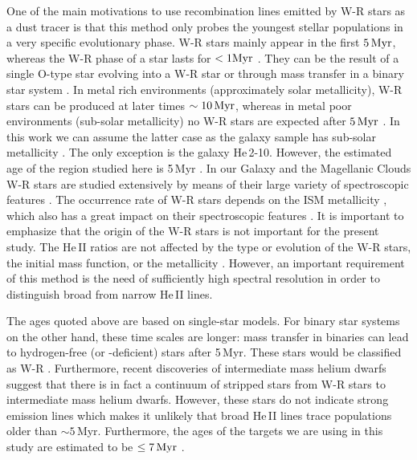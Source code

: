 \documentclass[]{aastex63}
\begin{document}
One of the main motivations to use recombination lines emitted by W-R stars as a dust tracer is that this method only probes the youngest stellar populations in a very specific evolutionary phase.
W-R stars mainly appear in the first ${\rm 5\,Myr}$, whereas the W-R phase of a star lasts for $< 1 {\rm Myr}$ \citep{meynet_stellar_2005}.
They can be the result of a single O-type star evolving into a W-R star \citep{meynet_massive_2017} or through mass transfer in a binary star system \citep{eldridge_binary_2017}. 
In metal rich environments (approximately solar metallicity), W-R stars can be produced at later times $\sim {\rm 10\,Myr}$, whereas in metal poor environments (sub-solar metallicity) no W-R stars are expected after ${\rm 5\,Myr}$ \citep[see Figure\,14 in ][]{leitherer_effects_2014}. In this work we can assume the latter case as the galaxy sample has sub-solar metallicity \citep[see Table\,1 in][]{chandar_ngc_2004}. The only exception is the galaxy He\,2-10. However, the estimated age of the region studied here is 5\,Myr \citep[see Table\,2 in][]{chandar_ngc_2004}.
In our Galaxy and the Magellanic Clouds W-R stars are studied extensively by means of their large variety of spectroscopic features \citep{crowther_physical_2007}. 
The occurrence rate of W-R stars depends on the ISM metallicity \citep{conti_evolution_1983, van_der_hucht_viith_2001}, which also has a great impact on their spectroscopic features \citep{mokiem_empirical_2007}.
It is important to emphasize that the origin of the W-R stars is not important for the present study. The He\,II ratios are not affected by the type or evolution of the W-R stars, the initial mass function, or the metallicity \citep{leitherer_he_2019}. 
However, an important requirement of this method is the need of sufficiently high spectral resolution in order to distinguish broad from narrow He\,II lines. 

The ages quoted above are based on single-star models. For binary star systems on the other hand, these time scales are longer: 
mass transfer in binaries can lead to hydrogen-free (or -deficient) stars after 5\,Myr. These stars would be classified as W-R \citep{xiao_emission-line_2018}. 
Furthermore, recent discoveries of intermediate mass helium dwarfs \citep{drout_discovery_2023,gotberg_stellar_2023} suggest that there is in fact a continuum of stripped stars from W-R stars to intermediate mass helium dwarfs. However, these stars do not indicate strong emission lines which makes it unlikely that broad He\,II lines trace populations older than $\sim5\,$Myr. Furthermore, the ages of the targets we are using in this study are estimated to be $\leq {\rm 7\,Myr}$ \citep[][their Table\,2]{chandar_ngc_2004}.
\end{document}
